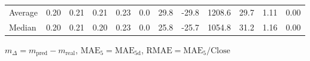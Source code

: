\begin{threeparttable}
{\begin{tabular}{lrrrrrrrrrrr}
Average &          0.20 &          0.21 &          0.21 &        0.23 &                 0.0 &                29.8 &      -29.8 &              1208.6 &             29.7 &            1.11 &                   0.00 \\
 Median &          0.20 &          0.21 &          0.20 &        0.23 &                 0.0 &                25.8 &      -25.7 &              1054.8 &             31.2 &            1.16 &                   0.00 \\
\bottomrule
\end{tabular}
}
\begin{tablenotes}\footnotesize
\item $m_\Delta=m_{\text{pred}}-m_{\text{real}}$,
$\mathrm{MAE}_5=\mathrm{MAE}_{5\text{d}}$,
$\mathrm{RMAE}=\mathrm{MAE}_5/\text{Close}$
\end{tablenotes}
\end{threeparttable}
\endgroup

